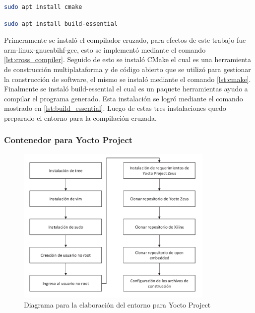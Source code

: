 \begin{lstlisting}[language=bash, caption={Instalacion de CMake, Contenedor}, label=lst:cmake]
    sudo apt install cmake
\end{lstlisting}

\begin{lstlisting}[language=bash, caption={Instalacion de build essential, Contenedor }, label=lst:build_essential]
    sudo apt install build-essential
\end{lstlisting}

Primeramente se instaló el compilador cruzado, para efectos de este trabajo fue arm-linux-gnueabihf-gcc, esto se implementó mediante el comando \ref{lst:cross_compiler}. Seguido de esto se instaló CMake el cual es una herramienta de construcción multiplataforma y de código abierto que se utilizó para gestionar la construcción de software, el mismo se instaló mediante el comando \ref{lst:cmake}. Finalmente se instaló build-essential el cual es un paquete herramientas ayudo a compilar el programa generado. Esta instalación se logró mediante el comando mostrado en \ref{lst:build_essential}. Luego de estas tres instalaciones quedo preparado el entorno para la compilación cruzada. 

\newpage

\subsubsection{Contenedor para Yocto Project}\label{subsec:generacion_entorno_yocto}

\begin{figure}[h!] 
    \centering
    \includegraphics[width=0.85\textwidth]{fig/especifico_2/diagrama_de_entorno_yocto_project.pdf}
    \caption{Diagrama para la elaboración del entorno para Yocto Project}
    \label{fig:yocto_enviroment_diagram_figure}
\end{figure}

